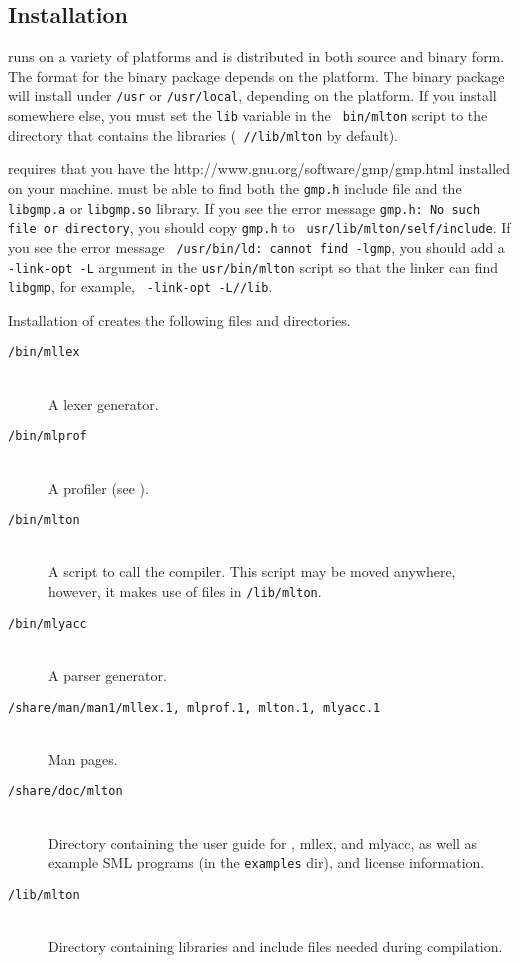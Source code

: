 %
\subsection{Installation}
%
{\mlton} runs on a variety of platforms and is distributed in both
source and binary form.  The format for the binary package depends on
the platform.  The binary package will install under {\tt /usr} or
{\tt /usr/local}, depending on the platform.  If you install {\mlton}
somewhere else, you must set the {\tt lib} variable in the {\tt
bin/mlton} script to the directory that contains the libraries ({\tt
/\prefix/lib/mlton} by default).

{\mlton} requires that you have the
		  {http://www.gnu.org/software/gmp/gmp.html}
installed on your machine.  {\mlton} must be able to find both the
{\tt gmp.h} include file and the {\tt libgmp.a} or {\tt libgmp.so}
library. If you see the error message {\tt gmp.h: No such file or
directory}, you should copy {\tt gmp.h} to {\tt
usr/lib/mlton/self/include}.  If you see the error message {\tt
/usr/bin/ld: cannot find -lgmp}, you 
should add a {\tt -link-opt -L} argument in the {\tt usr/bin/mlton}
script so that the linker can find {\tt libgmp}, for example, {\tt
-link-opt -L/\prefix/lib}.

Installation of {\mlton} creates the following files and directories.

\newcommand{\place}[1]{\item[\tt #1]\hspace{1in}\\}

\begin{description}

\place{\prefix/bin/mllex}
A lexer generator.

\place{\prefix/bin/mlprof}
A profiler (see ).

\place{\prefix/bin/mlton}
A script to call the compiler.
This script may be moved anywhere, however,
it makes use of files in {\tt \prefix/lib/mlton}.

\place{\prefix/bin/mlyacc}
A parser generator.

\place{\prefix/share/man/man1/mllex.1, mlprof.1, mlton.1, mlyacc.1}
Man pages.

\place{\prefix/share/doc/mlton}
Directory containing the user guide for {\mlton}, mllex, and mlyacc,
as well as example SML programs (in the {\tt examples} dir), and
license information.

\place{\prefix/lib/mlton}
Directory containing libraries and include files needed during
compilation.

\end{description}

